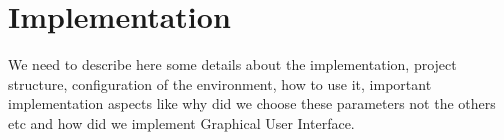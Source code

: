\chapter{Implementation}
\label{cha:implementation}

We need to describe here some details about the implementation, project structure, configuration of the environment, how to use it, important implementation aspects like why did we choose these parameters not the others etc and how did we implement Graphical User Interface.
